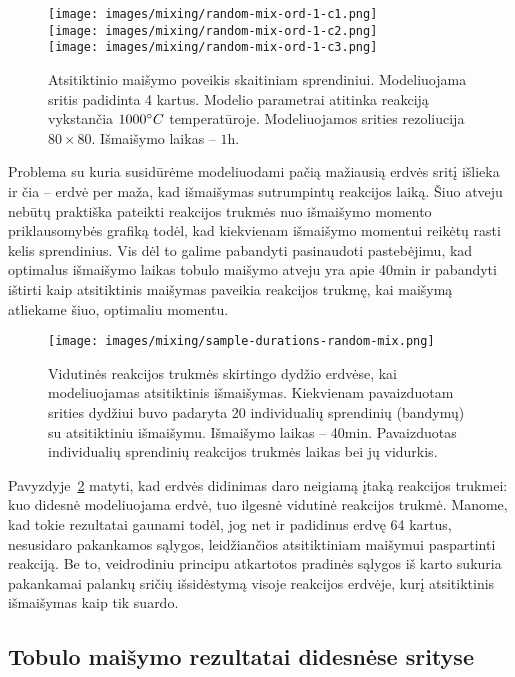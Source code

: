 \begin{figure}[h!]
  \centering
  \texttt{[image: images/mixing/random-mix-ord-1-c1.png]} \\ 
  \texttt{[image: images/mixing/random-mix-ord-1-c2.png]} \\
  \texttt{[image: images/mixing/random-mix-ord-1-c3.png]}
  \caption{Atsitiktinio maišymo poveikis skaitiniam sprendiniui. Modeliuojama sritis padidinta 4 kartus. Modelio parametrai atitinka reakciją vykstančia $1000\degree C$ temperatūroje. Modeliuojamos srities rezoliucija $80\times80$. Išmaišymo laikas -- $1\text{h}. $}
  \label{fig:random-mix-larger-example}
\end{figure}

Problema su kuria susidūrėme modeliuodami pačią mažiausią erdvės sritį išlieka ir čia -- erdvė per maža, kad išmaišymas sutrumpintų reakcijos laiką. Šiuo atveju nebūtų praktiška pateikti reakcijos trukmės nuo išmaišymo momento priklausomybės grafiką todėl, kad kiekvienam išmaišymo momentui reikėtų rasti kelis sprendinius. Vis dėl to galime pabandyti pasinaudoti pastebėjimu, kad optimalus išmaišymo laikas tobulo maišymo atveju yra apie 40min ir pabandyti ištirti kaip atsitiktinis maišymas paveikia reakcijos trukmę, kai maišymą atliekame šiuo, optimaliu momentu. 

\begin{figure}[h!]
  \centering
  \texttt{[image: images/mixing/sample-durations-random-mix.png]}
  \caption{Vidutinės reakcijos trukmės skirtingo dydžio erdvėse, kai modeliuojamas atsitiktinis išmaišymas. Kiekvienam pavaizduotam srities dydžiui buvo padaryta 20 individualių sprendinių (bandymų) su atsitiktiniu išmaišymu. Išmaišymo laikas -- 40min. Pavaizduotas individualių sprendinių reakcijos trukmės laikas bei jų vidurkis.}
  \label{fig:random-samples}
\end{figure}

Pavyzdyje~\ref{fig:random-samples} matyti, kad erdvės didinimas daro neigiamą įtaką reakcijos trukmei: kuo didesnė modeliuojama erdvė, tuo ilgesnė vidutinė reakcijos trukmė. Manome, kad tokie rezultatai gaunami todėl, jog net ir padidinus erdvę 64 kartus, nesusidaro pakankamos sąlygos, leidžiančios atsitiktiniam maišymui paspartinti reakciją. Be to, veidrodiniu principu atkartotos pradinės sąlygos iš karto sukuria pakankamai palankų sričių išsidėstymą visoje reakcijos erdvėje, kurį atsitiktinis išmaišymas kaip tik suardo.

\subsection{Tobulo maišymo rezultatai didesnėse srityse}

